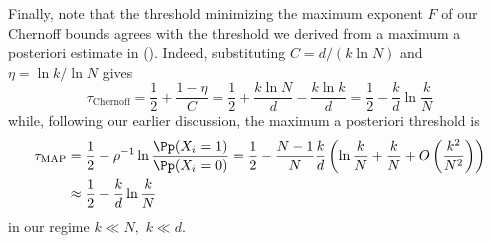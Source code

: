 Finally, note that the threshold minimizing the maximum exponent $F$ of our Chernoff bounds agrees with the threshold we derived from a maximum a posteriori estimate in  (). Indeed, substituting $C = d / (k \ln N)$ and $\eta = \ln k / \ln N$ gives
$$
\tau_{\text{Chernoff}} = \frac 1 2 + \frac{1 - \eta} C
= \frac 1 2 + \frac{k \ln N}{d} - \frac{k \ln k}{d}
= \frac 1 2 - \frac {k}{d} \ln \frac k N
$$
while, following our earlier discussion, the maximum a posteriori threshold is
\begin{align*}
\tau_{\text{MAP}} & = \frac 1 2 - \rho^{-1} \ln \frac{\Pp(X_i = 1)}{\Pp(X_i = 0)}
= \frac 1 2 - \frac{N - 1}N \frac k d \left(\ln \frac k N + \frac k N + O \left( \frac{k^2}{N^2} \right)\right) \\
& \approx \frac 1 2 - \frac k d \ln \frac k N
\end{align*}
in our regime $k \ll N,$ $k \ll d.$
